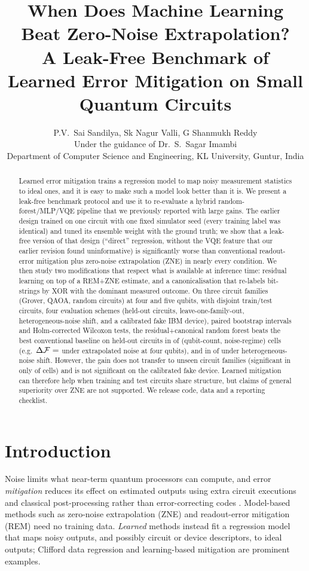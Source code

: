 \documentclass[11pt]{article}
\title{When Does Machine Learning Beat Zero-Noise Extrapolation?\\
A Leak-Free Benchmark of Learned Error Mitigation on Small Quantum Circuits}
\author{P.V.\ Sai Sandilya, Sk Nagur Valli, G Shanmukh Reddy\\
\small Under the guidance of Dr.\ S.\ Sagar Imambi\\
\small Department of Computer Science and Engineering, KL University, Guntur, India}
\date{}
\newcommand{\F}{\mathcal{F}}
\begin{document}
\maketitle

\begin{abstract}
Learned error mitigation trains a regression model to map noisy measurement statistics to ideal ones, and it is easy to make such a model look better than it is. We present a leak-free benchmark protocol and use it to re-evaluate a hybrid random-forest/MLP/VQE pipeline that we previously reported with large gains. The earlier design trained on one circuit with one fixed simulator seed (every training label was identical) and tuned its ensemble weight with the ground truth; we show that a leak-free version of that design (``direct'' regression, without the VQE feature that our earlier revision found uninformative) is significantly worse than conventional readout-error mitigation plus zero-noise extrapolation (ZNE) in nearly every condition. We then study two modifications that respect what is available at inference time: residual learning on top of a REM+ZNE estimate, and a canonicalisation that re-labels bit-strings by XOR with the dominant measured outcome. On three circuit families (Grover, QAOA, random circuits) at four and five qubits, with disjoint train/test circuits, four evaluation schemes (held-out circuits, leave-one-family-out, heterogeneous-noise shift, and a calibrated fake IBM device), paired bootstrap intervals and Holm-corrected Wilcoxon tests, the residual+canonical random forest beats the best conventional baseline on held-out circuits in  of  (qubit-count, noise-regime) cells (e.g.\ $\Delta\F=\stat{A}{4}{extrap}{RFC}{diff}$ under extrapolated noise at four qubits), and in  of  under heterogeneous-noise shift. However, the gain does not transfer to unseen circuit families (significant in only  of  cells) and is not significant on the calibrated fake device. Learned mitigation can therefore help when training and test circuits share structure, but claims of general superiority over ZNE are not supported. We release code, data and a reporting checklist.
\end{abstract}

\section{Introduction}
Noise limits what near-term quantum processors can compute, and error \emph{mitigation} reduces its effect on estimated outputs using extra circuit executions and classical post-processing rather than error-correcting codes \citep{temme2017,li2017,cai2023}. Model-based methods such as zero-noise extrapolation (ZNE) \citep{temme2017,kandala2019,giurgicatiron2020} and readout-error mitigation (REM) \citep{bravyi2021} need no training data. \emph{Learned} methods instead fit a regression model that maps noisy outputs, and possibly circuit or device descriptors, to ideal outputs; Clifford data regression \citep{czarnik2021} and learning-based mitigation \citep{strikis2021} are prominent examples.
\end{document}
